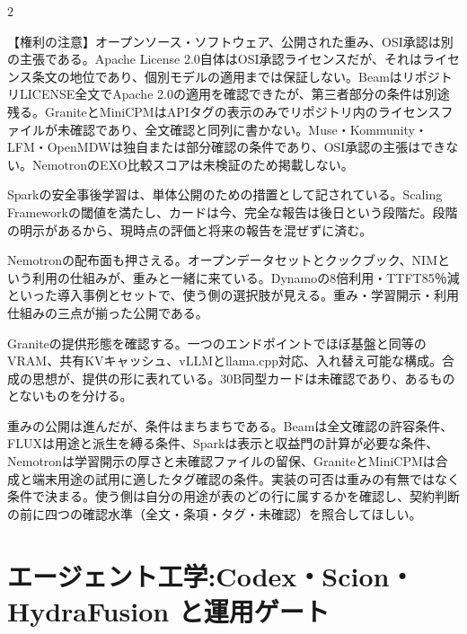 \documentclass[lualatex,a4paper,10pt]{jlreq}
\begin{document}
\begin{multicols}{2} %

\begin{tcolorbox}[colback=SurveySoft,colframe=SurveyRule,arc=1mm,boxrule=0.4pt,left=2mm,right=2mm]
【権利の注意】オープンソース・ソフトウェア、公開された重み、OSI承認は別の主張である。Apache License 2.0自体はOSI承認ライセンスだが、それはライセンス条文の地位であり、個別モデルの適用までは保証しない。BeamはリポジトリLICENSE全文でApache 2.0の適用を確認できたが、第三者部分の条件は別途残る。GraniteとMiniCPMはAPIタグの表示のみでリポジトリ内のライセンスファイルが未確認であり、全文確認と同列に書かない。Muse・Kommunity・LFM・OpenMDWは独自または部分確認の条件であり、OSI承認の主張はできない。NemotronのEXO比較スコアは未検証のため掲載しない。
\end{tcolorbox}
\cite{B14,B70,B15,B13,B71,B17,B19,B18,B16,B21,B72,B22,B20,B24,B73,B23,B25,B27,B74,B26,B29,B28,B30}

Sparkの安全事後学習は、単体公開のための措置として記されている。Scaling Frameworkの閾値を満たし、カードは今、完全な報告は後日という段階だ。段階の明示があるから、現時点の評価と将来の報告を混ぜずに済む。
\cite{B14,B70,B15,B13,B71}


Nemotronの配布面も押さえる。オープンデータセットとクックブック、NIMという利用の仕組みが、重みと一緒に来ている。Dynamoの8倍利用・TTFT85％減といった導入事例とセットで、使う側の選択肢が見える。重み・学習開示・利用仕組みの三点が揃った公開である。
\cite{B21,B72,B22,B20}


Graniteの提供形態を確認する。一つのエンドポイントでほぼ基盤と同等のVRAM、共有KVキャッシュ、vLLMとllama.cpp対応、入れ替え可能な構成。合成の思想が、提供の形に表れている。30B同型カードは未確認であり、あるものとないものを分ける。
\cite{B24,B73,B23,B25}


重みの公開は進んだが、条件はまちまちである。Beamは全文確認の許容条件、FLUXは用途と派生を縛る条件、Sparkは表示と収益門の計算が必要な条件、Nemotronは学習開示の厚さと未確認ファイルの留保、GraniteとMiniCPMは合成と端末用途の試用に適したタグ確認の条件。実装の可否は重みの有無ではなく条件で決まる。使う側は自分の用途が表のどの行に属するかを確認し、契約判断の前に四つの確認水準（全文・条項・タグ・未確認）を照合してほしい。
\cite{B14,B70,B15,B13,B71,B17,B19,B18,B16,B21,B72,B22,B20,B24,B73,B23,B25,B27,B74,B26,B29,B28,B30}


\section{エージェント工学:Codex・Scion・HydraFusion と運用ゲート}
\label{sec:P4}


\end{multicols}
\end{document}
